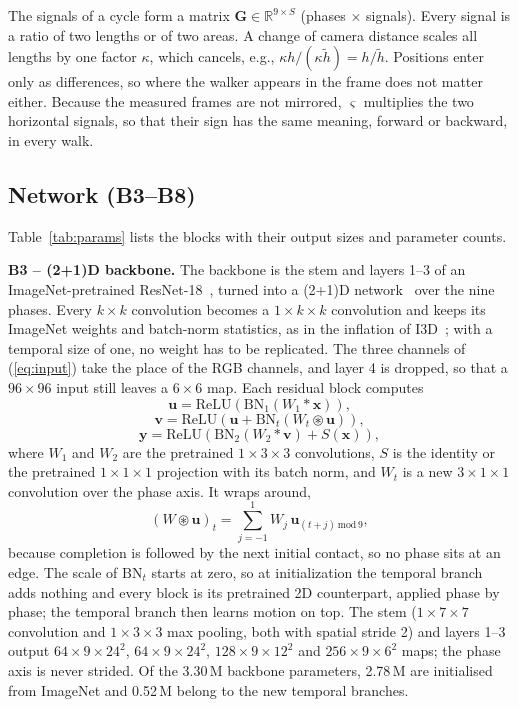 \documentclass[conference]{IEEEtran}
\begin{document}
The signals of a cycle form a matrix $\mathbf{G}\in\mathbb{R}^{9\times S}$ (phases $\times$ signals). Every signal is a ratio of two lengths or of two areas. A change of camera distance scales all lengths by one factor $\kappa$, which cancels, e.g., $\kappa h/(\kappa\tilde{h})=h/\tilde{h}$. Positions enter only as differences, so where the walker appears in the frame does not matter either. Because the measured frames are not mirrored, $\varsigma$ multiplies the two horizontal signals, so that their sign has the same meaning, forward or backward, in every walk.

\subsection{Network (B3--B8)}

Table~\ref{tab:params} lists the blocks with their output sizes and parameter counts.

\textbf{B3 -- (2+1)D backbone.} The backbone is the stem and layers 1--3 of an ImageNet-pretrained ResNet-18~\cite{resnet}, turned into a (2+1)D network~\cite{r2plus1d} over the nine phases. Every $k\times k$ convolution becomes a $1\times k\times k$ convolution and keeps its ImageNet weights and batch-norm statistics, as in the inflation of I3D~\cite{i3d}; with a temporal size of one, no weight has to be replicated. The three channels of (\ref{eq:input}) take the place of the RGB channels, and layer 4 is dropped, so that a $96\times96$ input still leaves a $6\times6$ map. Each residual block computes
\begin{equation}
\mathbf{u}=\mathrm{ReLU}\left(\mathrm{BN}_1(W_1*\mathbf{x})\right),
\end{equation}
\begin{equation}
\mathbf{v}=\mathrm{ReLU}\left(\mathbf{u}+\mathrm{BN}_t(W_t\circledast\mathbf{u})\right),
\end{equation}
\begin{equation}
\mathbf{y}=\mathrm{ReLU}\left(\mathrm{BN}_2(W_2*\mathbf{v})+S(\mathbf{x})\right),
\label{eq:block}
\end{equation}
where $W_1$ and $W_2$ are the pretrained $1\times3\times3$ convolutions, $S$ is the identity or the pretrained $1\times1\times1$ projection with its batch norm, and $W_t$ is a new $3\times1\times1$ convolution over the phase axis. It wraps around,
\begin{equation}
(W\circledast\mathbf{u})_t=\sum_{j=-1}^{1}W_j\,\mathbf{u}_{(t+j)\,\mathrm{mod}\,9},
\label{eq:circ}
\end{equation}
because completion is followed by the next initial contact, so no phase sits at an edge. The scale of $\mathrm{BN}_t$ starts at zero, so at initialization the temporal branch adds nothing and every block is its pretrained 2D counterpart, applied phase by phase; the temporal branch then learns motion on top. The stem ($1\times7\times7$ convolution and $1\times3\times3$ max pooling, both with spatial stride 2) and layers 1--3 output $64\times9\times24^2$, $64\times9\times24^2$, $128\times9\times12^2$ and $256\times9\times6^2$ maps; the phase axis is never strided. Of the 3.30\,M backbone parameters, 2.78\,M are initialised from ImageNet and 0.52\,M belong to the new temporal branches.
\end{document}
